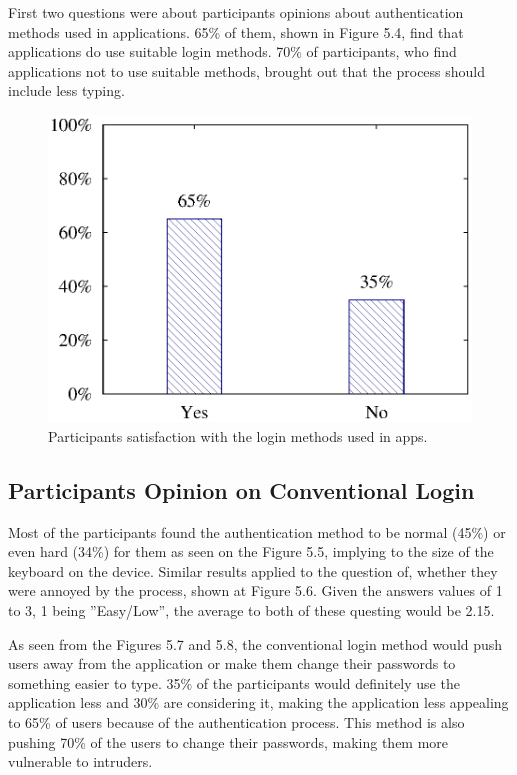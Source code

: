 First two questions were about participants opinions about authentication methods used in applications. 65\% of them, shown in Figure 5.4, find that applications do use suitable login methods. 70\% of participants, who find applications not to use suitable methods, brought out that the process should include less typing. 

\begin{figure}[H]
\centering
\includegraphics[scale=.7]{files/question1/question1.eps}
\caption{Participants satisfaction with the login methods used in apps.}
\label{fig:digraph}
\end{figure}

\subsection{Participants Opinion on Conventional Login}
Most of the participants found the authentication method to be normal (45\%) or even hard (34\%) for them as seen on the Figure 5.5, implying to the size of the keyboard on the device. Similar results applied to the question of, whether they were annoyed by the process, shown at Figure 5.6. Given the answers values of 1 to 3, 1 being ''Easy/Low'', the average to both of these questing would be 2.15. 

As seen from the Figures 5.7 and 5.8, the conventional login method would push users away from the application or make them change their passwords to something easier to type. 35\% of the participants would definitely use the application less and 30\% are considering it, making the application less appealing to 65\% of users because of the authentication process. This method is also pushing 70\% of the  users to change their passwords, making them more vulnerable to intruders.  

